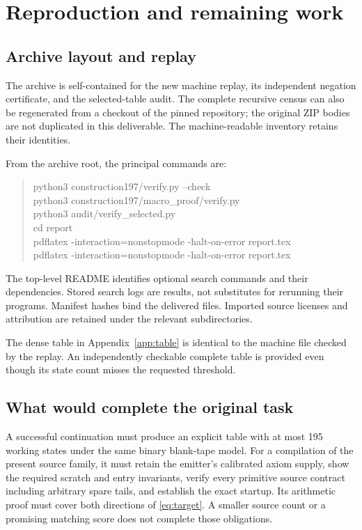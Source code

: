 \documentclass[11pt,a4paper]{article}
\begin{document}


\section{Reproduction and remaining work}

\subsection{Archive layout and replay}

The archive is self-contained for the new machine replay, its independent
negation certificate, and the selected-table audit. The complete recursive
census can also be regenerated from a checkout of the pinned repository;
the original ZIP bodies are not duplicated in this deliverable. The
machine-readable inventory retains their identities.

From the archive root, the principal commands are:
\begin{quote}\small\ttfamily
python3 construction197/verify.py --check\\
python3 construction197/macro\_proof/verify.py\\
python3 audit/verify\_selected.py\\
cd report\\
pdflatex -interaction=nonstopmode -halt-on-error report.tex\\
pdflatex -interaction=nonstopmode -halt-on-error report.tex
\end{quote}
The top-level README identifies optional search commands and their
dependencies. Stored search logs are results, not substitutes for rerunning
their programs. Manifest hashes bind the delivered files. Imported source
licenses and attribution are retained under the relevant subdirectories.

The dense table in Appendix~\ref{app:table} is identical to the machine
file checked by the replay. An independently checkable complete table is
provided even though its state count misses the requested threshold.

\subsection{What would complete the original task}

A successful continuation must produce an explicit table with at most 195
working states under the same binary blank-tape model. For a compilation
of the present source family, it must retain the emitter's calibrated
axiom supply, show the required scratch and entry invariants, verify every
primitive source contract including arbitrary spare tails, and establish
the exact startup. Its arithmetic proof must cover both directions of
\eqref{eq:target}. A smaller source count or a promising matching score
does not complete those obligations.
\end{document}
